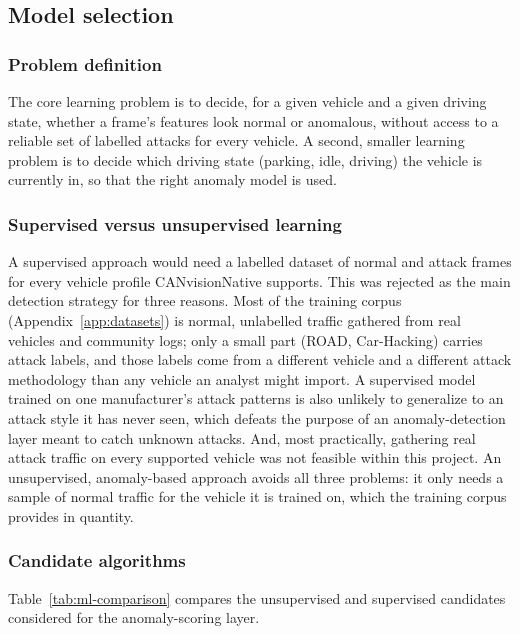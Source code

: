 \subsection{Model selection}
\label{sec:ml-selection}

\subsubsection{Problem definition}

The core learning problem is to decide, for a given vehicle and a given driving state, whether a frame's features look normal or anomalous, without access to a reliable set of labelled attacks for every vehicle. A second, smaller learning problem is to decide which driving state (parking, idle, driving) the vehicle is currently in, so that the right anomaly model is used.

\subsubsection{Supervised versus unsupervised learning}

A supervised approach would need a labelled dataset of normal and attack frames for every vehicle profile CANvisionNative supports. This was rejected as the main detection strategy for three reasons. Most of the training corpus (Appendix~\ref{app:datasets}) is normal, unlabelled traffic gathered from real vehicles and community logs; only a small part (ROAD, Car-Hacking) carries attack labels, and those labels come from a different vehicle and a different attack methodology than any vehicle an analyst might import. A supervised model trained on one manufacturer's attack patterns is also unlikely to generalize to an attack style it has never seen, which defeats the purpose of an anomaly-detection layer meant to catch unknown attacks. And, most practically, gathering real attack traffic on every supported vehicle was not feasible within this project. An unsupervised, anomaly-based approach avoids all three problems: it only needs a sample of normal traffic for the vehicle it is trained on, which the training corpus provides in quantity.

\subsubsection{Candidate algorithms}

Table~\ref{tab:ml-comparison} compares the unsupervised and supervised candidates considered for the anomaly-scoring layer.

